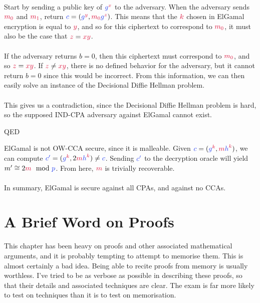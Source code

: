 \\
	Start by sending a public key of $\blue{g}^\red{x}$ to the adversary. When the adversary sends $\red{m_0}$ and $\red{m_1}$, return $\blue{c} = (\blue{g}^\red{y}, \red{m_0}\blue{g}^\red{z})$. This means that the $\red{k}$ chosen in ElGamal encryption is equal to $\red{y}$, and so for this ciphertext to correspond to $\red{m_0}$, it must also be the case that $\red{z} = \red{xy}$.\\
\\
	If the adversary returns $b=0$, then this ciphertext must correspond to $\red{m_0}$, and so $\red{z}=\red{xy}$. If $\red{z} \neq \red{xy}$, there is no defined behavior for the adversary, but it cannot return $b=0$ since this would be incorrect. From this information, we can then easily solve an instance of the Decisional Diffie Hellman problem.\\
\\
	This gives us a contradiction, since the Decisional Diffie Hellman problem is hard, so the supposed IND-CPA adversary against ElGamal cannot exist.
\begin{flushright}
QED\\
\end{flushright}
	ElGamal is not OW-CCA secure, since it is malleable. Given $\blue{c}=(\blue{g}^\red{k},\red{m}\blue{h}^\red{k})$, we can compute $\blue{c'}=(\blue{g}^\red{k},2\red{m}\blue{h}^\red{k}) \neq \blue{c}$. Sending $\blue{c'}$ to the decryption oracle will yield $m' \cong 2\red{m} \mod \blue{p}$. From here, $\red{m}$ is trivially recoverable.\\
\\
	In summary, ElGamal is secure against all CPAs, and against no CCAs.\\

\section{A Brief Word on Proofs}

	This chapter has been heavy on proofs and other associated mathematical arguments, and it is probably tempting to attempt to memorise them. This is almost certainly a bad idea. Being able to recite proofs from memory is usually worthless. I've tried to be as verbose as possible in describing these proofs, so that their details and associated techniques are clear. The exam is far more likely to test on techniques than it is to test on memorisation.
